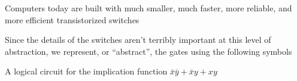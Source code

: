\documentclass[8pt,a4paper,compress]{beamer}
\begin{document}
\begin{frame}[fragile]
\pause

Computers today are built with much smaller, much faster, more reliable, and more efficient transistorized switches 

\pause
\bigskip

Since the details of the switches aren't terribly important at this level of abstraction, we represent, or ``abstract'', the gates using the following symbols
\begin{center}
\end{center}

\pause
\bigskip

A logical circuit for the implication function $\bar{x}\bar{y}+\bar{x}y+xy$
\begin{center}
\end{center}
\end{frame}
\end{document}
